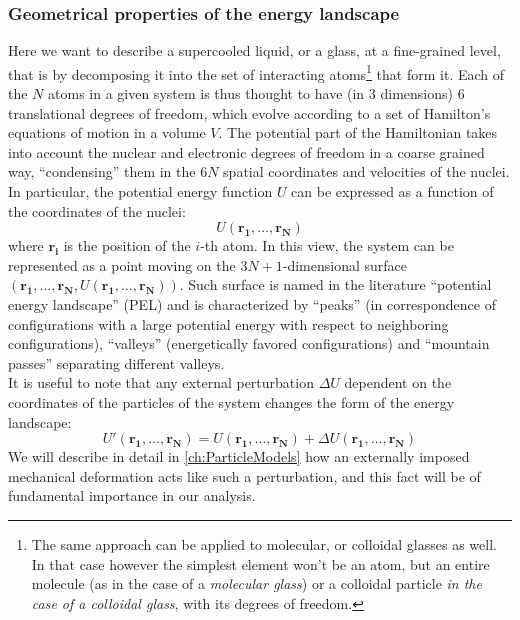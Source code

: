 \subsubsection{Geometrical properties of the energy landscape}
Here we want to describe a supercooled liquid, or a glass, at a fine-grained level, that is by decomposing it into the set of interacting atoms\footnote{The same approach can be applied to molecular, or colloidal glasses as well. In that case however the simplest element won't be an atom, but an entire molecule (as in the case of a \emph{molecular glass}) or a colloidal particle \emph{in the case of a colloidal glass}, with its degrees of freedom.} that form it. Each of the $N$ atoms in a given system is thus thought to have (in 3 dimensions) 6 translational degrees of freedom, which evolve according to a set of Hamilton's equations of motion in a volume $V$. The potential part of the Hamiltonian takes into account the nuclear and electronic degrees of freedom in a coarse grained way, ``condensing'' them in the $6N$ spatial coordinates and velocities of the nuclei. In particular, the potential energy function $U$ can be expressed as a function of the coordinates of the nuclei:
\begin{equation}
	U(\mathbf{r_{1}, \ldots, r_{N}})
	\label{eq:TotalPotentialEnergy}
\end{equation}
where $\mathbf{r_{i}}$ is the position of the $i$-th atom. 
In this view, the system can be represented as a point moving on the $3N + 1$-dimensional surface $(\mathbf{r_{1}, \ldots, r_{N}}, U(\mathbf{r_{1}, \ldots, r_{N}}))$. Such surface is named in the literature ``potential energy landscape'' (PEL) and is characterized by ``peaks'' (in correspondence of configurations with a large potential energy with respect to neighboring configurations), ``valleys'' (energetically favored configurations) and ``mountain passes'' separating different valleys.\\
It is useful to note that any external perturbation $\Delta U$ dependent on the coordinates of the particles of the system changes the form of the energy landscape:
\begin{equation}
	U'(\mathbf{r_{1}, \ldots, r_{N}}) = U(\mathbf{r_{1}, \ldots, r_{N}}) + \Delta U(\mathbf{r_{1}, \ldots, r_{N}})
	\label{eq:PerturbedTotalPotentialEnergy}
\end{equation}
We will describe in detail in \autoref{ch:ParticleModels} how an externally imposed mechanical deformation acts like such a perturbation, and this fact will be of fundamental importance in our analysis.

